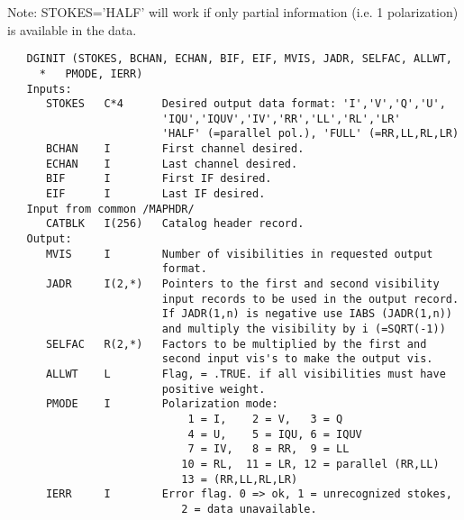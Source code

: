 Note: STOKES='HALF' will work if only partial information (i.e.
1 polarization) is available in the data.
\begin{verbatim}
   DGINIT (STOKES, BCHAN, ECHAN, BIF, EIF, MVIS, JADR, SELFAC, ALLWT,
     *   PMODE, IERR)
   Inputs:
      STOKES   C*4      Desired output data format: 'I','V','Q','U',
                        'IQU','IQUV','IV','RR','LL','RL','LR'
                        'HALF' (=parallel pol.), 'FULL' (=RR,LL,RL,LR)
      BCHAN    I        First channel desired.
      ECHAN    I        Last channel desired.
      BIF      I        First IF desired.
      EIF      I        Last IF desired.
   Input from common /MAPHDR/
      CATBLK   I(256)   Catalog header record.
   Output:
      MVIS     I        Number of visibilities in requested output
                        format.
      JADR     I(2,*)   Pointers to the first and second visibility
                        input records to be used in the output record.
                        If JADR(1,n) is negative use IABS (JADR(1,n))
                        and multiply the visibility by i (=SQRT(-1))
      SELFAC   R(2,*)   Factors to be multiplied by the first and
                        second input vis's to make the output vis.
      ALLWT    L        Flag, = .TRUE. if all visibilities must have
                        positive weight.
      PMODE    I        Polarization mode:
                            1 = I,    2 = V,   3 = Q
                            4 = U,    5 = IQU, 6 = IQUV
                            7 = IV,   8 = RR,  9 = LL
                           10 = RL,  11 = LR, 12 = parallel (RR,LL)
                           13 = (RR,LL,RL,LR)
      IERR     I        Error flag. 0 => ok, 1 = unrecognized stokes,
                           2 = data unavailable.
\end{verbatim}



